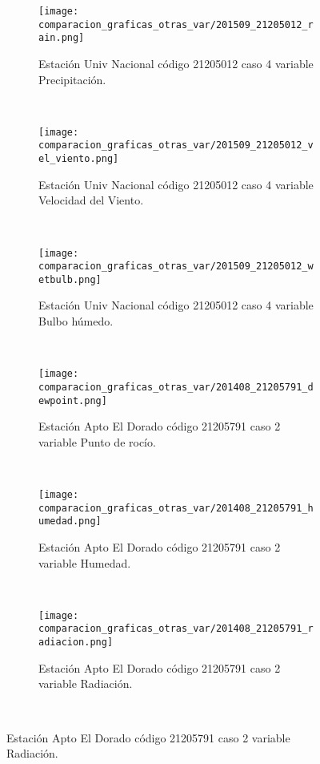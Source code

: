 \begin{figure}[H]
\centering
\begin{subfigure}[normla]{0.4\textwidth}
\caption{Estación Univ Nacional código 21205012 caso 4 variable Precipitación.}
\texttt{[image: comparacion\_graficas\_otras\_var/201509\_21205012\_rain.png]}
\end{subfigure}
~
\begin{subfigure}[normla]{0.4\textwidth}
\caption{Estación Univ Nacional código 21205012 caso 4 variable Velocidad del Viento.}
\texttt{[image: comparacion\_graficas\_otras\_var/201509\_21205012\_vel\_viento.png]}
\end{subfigure}
~
\begin{subfigure}[normla]{0.4\textwidth}
\caption{Estación Univ Nacional código 21205012 caso 4 variable Bulbo húmedo.}
\texttt{[image: comparacion\_graficas\_otras\_var/201509\_21205012\_wetbulb.png]}
\end{subfigure}
~
\begin{subfigure}[normla]{0.4\textwidth}
\caption{Estación Apto El Dorado código 21205791 caso 2 variable Punto de rocío.}
\texttt{[image: comparacion\_graficas\_otras\_var/201408\_21205791\_dewpoint.png]}
\end{subfigure}
~
\begin{subfigure}[normla]{0.4\textwidth}
\caption{Estación Apto El Dorado código 21205791 caso 2 variable Humedad.}
\texttt{[image: comparacion\_graficas\_otras\_var/201408\_21205791\_humedad.png]}
\end{subfigure}
~
\begin{subfigure}[normla]{0.4\textwidth}
\caption{Estación Apto El Dorado código 21205791 caso 2 variable Radiación.}
\texttt{[image: comparacion\_graficas\_otras\_var/201408\_21205791\_radiacion.png]}
\end{subfigure}
~
\end{figure}
           
